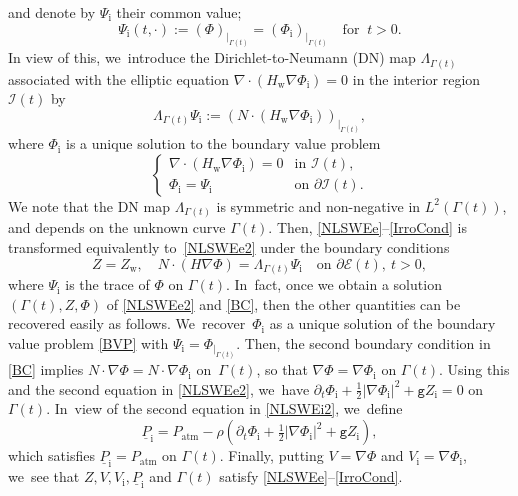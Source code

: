 \documentclass[11pt]{article}
\newcommand{\gr}{{\mathtt g}}
\newcommand{\dt}{\partial_t}
\newcommand{\cI}{{\mathcal I}}
\newcommand{\cE}{{\mathcal E}}
\newcommand{\ul}[1]{\underline{#1}}
\newcommand{\itGamma}{\mathit{\Gamma}}
\theoremstyle{definition}
\begin{document}
and denote by $\Psi_\mathrm{i}$ their common value;
\begin{equation}\label{ContPhi}
\Psi_\mathrm{i}(t,\cdot):= (\Phi)_{\vert_{ \itGamma(t)}}=(\Phi_\mathrm{i})_{\vert_{ \itGamma(t)}} \quad\text{for } \ t>0.
\end{equation}
In view of this, we~introduce the Dirichlet-to-Neumann (DN) map $\Lambda_{\itGamma(t)}$ associated with the elliptic equation
$\nabla\cdot(H_\mathrm{w}\nabla\Phi_\mathrm{i})=0$ in the interior region $\cI(t)$ by
\begin{equation}\label{defDN}
\Lambda_{\itGamma(t)} \Psi_\mathrm{i}:= (N\cdot (H_\mathrm{w}\nabla\Phi_\mathrm{i}))_{\vert_{\itGamma(t)}},
\end{equation}
where $\Phi_\mathrm{i}$ is a unique solution to the boundary value problem
\begin{equation}\label{BVP}
\begin{cases}
\nabla\cdot(H_\mathrm{w}\nabla\Phi_\mathrm{i})=0 &\text{in } \cI(t), \\
\Phi_\mathrm{i}=\Psi_\mathrm{i} &\text{on } \partial\cI(t).
\end{cases}
\end{equation}
We note that the DN map $\Lambda_{\itGamma(t)}$ is symmetric and non-negative in $L^2(\itGamma(t))$, and depends on the unknown curve $\itGamma(t)$.
Then, \eqref{NLSWEe}--\eqref{IrroCond} is transformed equivalently to~\eqref{NLSWEe2} under the boundary conditions
\begin{equation}\label{BC}
Z=Z_\mathrm{w}, \quad N\cdot(H\nabla\Phi)=\Lambda_{\itGamma(t)}\Psi_\mathrm{i} \quad\text{on } \partial\cE(t), \ t>0,
\end{equation}
where $\Psi_\mathrm{i}$ is the trace of $\Phi$ on $\itGamma(t)$. In~fact, once we obtain a solution $(\itGamma(t),Z,\Phi)$ of \eqref{NLSWEe2} and \eqref{BC}, then the other quantities can be recovered easily as follows. We~recover~$\Phi_\mathrm{i}$ as a unique solution of the boundary value problem \eqref{BVP} with $\Psi_\mathrm{i}=\Phi_{\vert_{\itGamma(t)}}$.
Then, the second boundary condition in \eqref{BC} implies $N\cdot\nabla\Phi=N\cdot\nabla\Phi_\mathrm{i}$ on~$\itGamma(t)$,
so that $\nabla\Phi=\nabla\Phi_\mathrm{i}$ on $\itGamma(t)$.
Using this and the second equation in \eqref{NLSWEe2}, we~have $\dt\Phi_\mathrm{i} + \frac12|\nabla\Phi_\mathrm{i}|^2 + \gr Z_\mathrm{i} = 0$ on $\itGamma(t)$. In~view of the second equation in \eqref{NLSWEi2}, we~define
\begin{equation}\label{defPi}
\ul{P}_\mathrm{i}=P_\mathrm{atm}-\rho(\dt\Phi_\mathrm{i} + \tfrac12|\nabla\Phi_\mathrm{i}|^2 + \gr Z_\mathrm{i}),
\end{equation}
which satisfies $\ul{P}_\mathrm{i}=P_\mathrm{atm}$ on $\itGamma(t)$.
Finally, putting $V=\nabla\Phi$ and $V_\mathrm{i}=\nabla\Phi_\mathrm{i}$, we~see that $Z,V,V_\mathrm{i},\ul{P}_\mathrm{i}$ and $\itGamma(t)$ satisfy \eqref{NLSWEe}--\eqref{IrroCond}.
\end{document}
